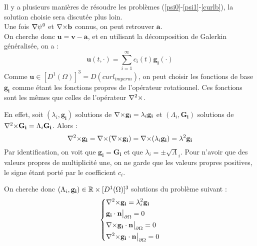 Il y a plusieurs manières de résoudre les problèmes (\ref{psi0}-\ref{psi1}-\ref{curlb}), la solution choisie sera discutée plus loin.\\

Une fois ${\nabla}\psi^0$ et ${\nabla\times} \mathbf{b}$ connus, on peut retrouver $\mathbf{a}$.\\

On cherche donc $\mathbf{u}=\mathbf{v}-\mathbf{a}$, et en utilisant la décomposition de Galerkin généralisée, on a :
\begin{equation}\label{u}
\mathbf{u}(t,\cdot) = \sum_{i=1}^{\infty} c_i(t)\mathbf{g_i}(\cdot)
\end{equation}
Comme $\mathbf{u}\in [D^1(\Omega)]^3=D(curl_{imperm})$, on peut choisir les fonctions de base
$\mathbf{g_i}$ comme étant les fonctions propres de l'opérateur rotationnel. Ces
fonctions sont les mêmes que celles de l'opérateur ${\nabla^2\times}$.

En effet, soit $(\lambda_i,\mathbf{g_i})$ solutions de ${\nabla\times} \mathbf{g_i} = \lambda_i\mathbf{g_i}$ et $(\Lambda_i,\mathbf{G_i})$ solutions de ${\nabla^2\times} \mathbf{G_i} = \Lambda_i\mathbf{G_i}$. Alors :
\[ {\nabla^2\times} \mathbf{g_i} = {\nabla\times}({\nabla\times} \mathbf{g_i})={\nabla\times}(\lambda_i\mathbf{g_i})=\lambda^2\mathbf{g_i} \]
Par identification, on voit que $\mathbf{g_i}=\mathbf{G_i}$ et que $\lambda_i=\pm\sqrt\Lambda_i$. Pour n'avoir que des valeurs propres de multiplicité une, on ne garde que les valeurs propres positives, le signe étant porté par le coefficient $c_i$.

On cherche donc $(\Lambda_i,\mathbf{g_i})\in{\mathbb{R}}\times [D^1(\Omega)]^3$ solutions du problème suivant :
\begin{equation}\label{curlcurl}
\left\{\begin{aligned}
&{\nabla^2\times}  \mathbf{g_i} = \lambda_i^2 \mathbf{g_i}\\
&\mathbf{g_i}\cdot \mathbf{n}{\big\rvert_{\partial\Omega}} = 0\\
&{\nabla\times} \mathbf{g_i}\cdot \mathbf{n}{\big\rvert_{\partial\Omega}} = 0\\
&{\nabla^2\times}  \mathbf{g_i}\cdot \mathbf{n}{\big\rvert_{\partial\Omega}} = 0
\end{aligned}\right.
\end{equation}

